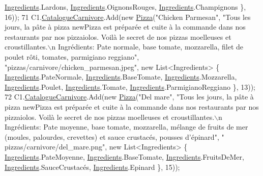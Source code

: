 \begin{DoxyCode}
      \hyperlink{namespaceModele_a001a8e89e56a724f24a249ba98080d41}{Ingredients}.Lardons, \hyperlink{namespaceModele_a001a8e89e56a724f24a249ba98080d41}{Ingredients}.OignonsRouges, 
      \hyperlink{namespaceModele_a001a8e89e56a724f24a249ba98080d41}{Ingredients}.Champignons \}, 16));
71             C1.\hyperlink{classModele_1_1Catalogue_a4af9ef768f67cef6dfe545e22a6d63af}{CatalogueCarnivore}.Add(\textcolor{keyword}{new} \hyperlink{classModele_1_1Pizza}{Pizza}(\textcolor{stringliteral}{"Chicken Parmesan"}, \textcolor{stringliteral}{"Tous les jours,
       la pâte à pizza newPizza est préparée et cuite à la commande dans nos restaurants par nos pizzaiolos. Voilà
       le secret de nos pizzas moelleuses et croustillantes.\(\backslash\)n Ingrédients: Pate normale, base tomate, mozzarella,
       filet de poulet rôti, tomates, parmigiano reggiano"}, \textcolor{stringliteral}{"pizzas/carnivore/chicken\_parmesan.jpeg"}, \textcolor{keyword}{new} 
      List<Ingredients> \{ \hyperlink{namespaceModele_a001a8e89e56a724f24a249ba98080d41}{Ingredients}.PateNormale, \hyperlink{namespaceModele_a001a8e89e56a724f24a249ba98080d41}{Ingredients}.BaseTomate, 
      \hyperlink{namespaceModele_a001a8e89e56a724f24a249ba98080d41}{Ingredients}.Mozzarella, \hyperlink{namespaceModele_a001a8e89e56a724f24a249ba98080d41}{Ingredients}.Poulet, \hyperlink{namespaceModele_a001a8e89e56a724f24a249ba98080d41}{Ingredients}.Tomate, 
      \hyperlink{namespaceModele_a001a8e89e56a724f24a249ba98080d41}{Ingredients}.ParmigianoReggiano \}, 13));
72             C1.\hyperlink{classModele_1_1Catalogue_a4af9ef768f67cef6dfe545e22a6d63af}{CatalogueCarnivore}.Add(\textcolor{keyword}{new} \hyperlink{classModele_1_1Pizza}{Pizza}(\textcolor{stringliteral}{"Del mare"}, \textcolor{stringliteral}{"Tous les jours, la pâte
       à pizza newPizza est préparée et cuite à la commande dans nos restaurants par nos pizzaiolos. Voilà le
       secret de nos pizzas moelleuses et croustillantes.\(\backslash\)n Ingrédients: Pate moyenne, base tomate, mozzarella, mélange
       de fruits de mer (moules, palourdes, crevettes) et sauce crustacés, pousses d’épinard"}, \textcolor{stringliteral}{"
      pizzas/carnivore/del\_mare.png"}, \textcolor{keyword}{new} List<Ingredients> \{ \hyperlink{namespaceModele_a001a8e89e56a724f24a249ba98080d41}{Ingredients}.PateMoyenne, 
      \hyperlink{namespaceModele_a001a8e89e56a724f24a249ba98080d41}{Ingredients}.BaseTomate, \hyperlink{namespaceModele_a001a8e89e56a724f24a249ba98080d41}{Ingredients}.FruitsDeMer, 
      \hyperlink{namespaceModele_a001a8e89e56a724f24a249ba98080d41}{Ingredients}.SauceCrustacés, \hyperlink{namespaceModele_a001a8e89e56a724f24a249ba98080d41}{Ingredients}.Epinard \}, 15));

\end{DoxyCode}
